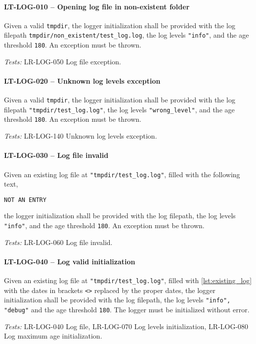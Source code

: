 \paragraph{LT-LOG-010 -- Opening log file in non-existent folder}
Given a valid \lstinline{tmpdir}, the logger initialization
shall be provided with the log filepath
\lstinline{tmpdir/non_existent/test_log.log},
the log levels \lstinline{"info"}, and the age threshold \lstinline{180}.
An exception must be thrown.

\textit{Tests: } LR-LOG-050 Log file exception.

\paragraph{LT-LOG-020 -- Unknown log levels exception}
Given a valid \lstinline{tmpdir}, the logger initialization
shall be provided with the log filepath \lstinline{"tmpdir/test_log.log"},
the log levels \lstinline{"wrong_level"}, and the age threshold
\lstinline{180}.
An exception must be thrown.

\textit{Tests: } LR-LOG-140 Unknown log levels exception.

\paragraph{LT-LOG-030 -- Log file invalid}
Given an existing log file at \lstinline{"tmpdir/test_log.log"},
filled with the following text,
\begin{lstlisting}
NOT AN ENTRY
\end{lstlisting}
the logger initialization shall be provided with the log filepath,
the log levels \lstinline{"info"}, and the age threshold \lstinline{180}.
An exception must be thrown.

\textit{Tests: } LR-LOG-060 Log file invalid.

\paragraph{LT-LOG-040 -- Log valid initialization}
Given an existing log file at \lstinline{"tmpdir/test_log.log"},
filled with \cref{lst:existing_log} with the dates in brackets \lstinline{<>}
replaced by the proper dates, the logger initialization shall be
provided with the log filepath, the log levels \lstinline{"info", "debug"}
and the age threshold \lstinline{180}.
The logger must be initialized without error.

\textit{Tests: } LR-LOG-040 Log file, LR-LOG-070 Log levels initialization,
                 LR-LOG-080 Log maximum age initialization.

